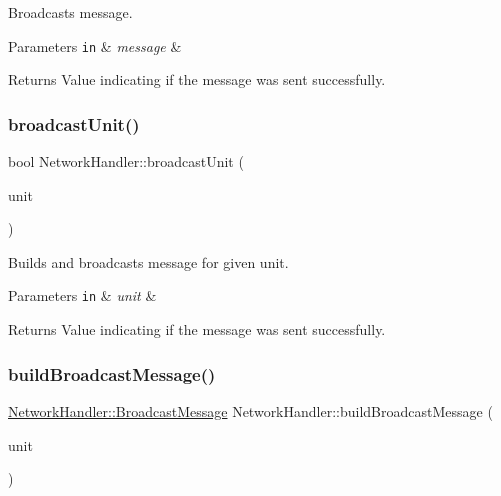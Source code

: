 Broadcasts message. 


\begin{DoxyParams}[1]{Parameters}
\mbox{\tt in}  & {\em message} & \\
\hline
\end{DoxyParams}
\begin{DoxyReturn}{Returns}
Value indicating if the message was sent successfully. 
\end{DoxyReturn}
\mbox{\label{classNetworkHandler_a515ae3ef779f2244cfdcccbbb24c8cb2}} 
\subsubsection{\texorpdfstring{broadcast\+Unit()}{broadcastUnit()}}
{\footnotesize\ttfamily bool Network\+Handler\+::broadcast\+Unit (\begin{DoxyParamCaption}\item[{\mbox{\hyperlink{classLightUnit}{Light\+Unit}} \&}]{unit }\end{DoxyParamCaption})}



Builds and broadcasts message for given unit. 


\begin{DoxyParams}[1]{Parameters}
\mbox{\tt in}  & {\em unit} & \\
\hline
\end{DoxyParams}
\begin{DoxyReturn}{Returns}
Value indicating if the message was sent successfully. 
\end{DoxyReturn}
\mbox{\label{classNetworkHandler_a0e8984b42f72b35466d409319c938e4d}} 
\subsubsection{\texorpdfstring{build\+Broadcast\+Message()}{buildBroadcastMessage()}}
{\footnotesize\ttfamily \mbox{\hyperlink{structNetworkHandler_1_1BroadcastMessage}{Network\+Handler\+::\+Broadcast\+Message}} Network\+Handler\+::build\+Broadcast\+Message (\begin{DoxyParamCaption}\item[{\mbox{\hyperlink{classLightUnit}{Light\+Unit}} \&}]{unit }\end{DoxyParamCaption})}



